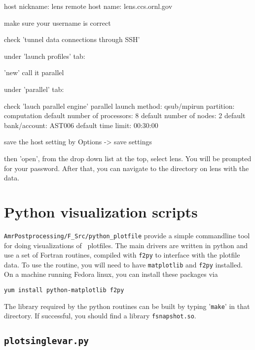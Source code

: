       host nickname: lens
      remote host name: lens.ccs.ornl.gov
     
      make sure your username is correct

      check 'tunnel data connections through SSH'


   under 'launch profiles' tab:

       'new'
       call it parallel

       under 'parallel' tab:

         check 'lauch parallel engine'
         parallel launch method: qsub/mpirun
         partition: computation
         default number of processors: 8
         default number of nodes: 2
         default bank/account: AST006
         default time limit: 00:30:00


save the host setting by Options -> save settings



then 'open', from the drop down list at the top, select lens.  You
will be prompted for your password.  After that, you can navigate to
the directory on lens with the data.



\section{Python visualization scripts}
\label{sec:vis:python}


{\tt AmrPostprocessing/F\_Src/python\_plotfile} provide a simple commandline
tool for doing visualizations of \boxlib\ plotfiles.  The main drivers
are written in python and use a set of Fortran routines, compiled with
{\tt f2py} to interface with the plotfile data.  To use the routine,
you will need to have {\tt matplotlib} and {\tt f2py} installed.  On a
machine running Fedora linux, you can install these packages via
\begin{verbatim}   
yum install python-matplotlib f2py
\end{verbatim}
%
The library required by the python routines can be built by typing
'{\tt make}' in that directory.  If successful, you should find
a library {\tt fsnapshot.so}. 

\subsection{\tt plotsinglevar.py}


